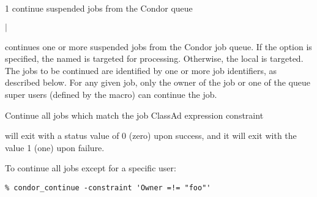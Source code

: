 \begin{ManPage}{\label{man-condor-continue}}{1}
{continue suspended jobs from the Condor queue}
\Synopsis {}
\ToolArgsBase

\ToolDebugOption
\ToolLocate
\ToolJobs
$|$  \Dots

\ToolDebugOption
\ToolLocate
\ToolAll


\Description

 continues one or more suspended jobs from the Condor job queue.  
If the  option is specified, the named  is targeted
for processing.  
Otherwise, the local  is targeted.
The jobs to be continued are identified by one or more job identifiers, as
described below.
For any given job, only the owner of the job or one of the queue super users
(defined by the  macro) can continue the job.

\begin{Options}
	\ToolArgsBaseDesc
	\ToolLocateDesc
    \ToolDebugDesc
	 {Continue all jobs which match
	                the job ClassAd expression constraint}
\end{Options}

\ExitStatus

 will exit with a status value of 0 (zero) upon success,
and it will exit with the value 1 (one) upon failure.

\Examples
To continue all jobs except for a specific user:
\footnotesize
\begin{verbatim}
% condor_continue -constraint 'Owner =!= "foo"'
\end{verbatim}
\normalsize

\end{ManPage}
